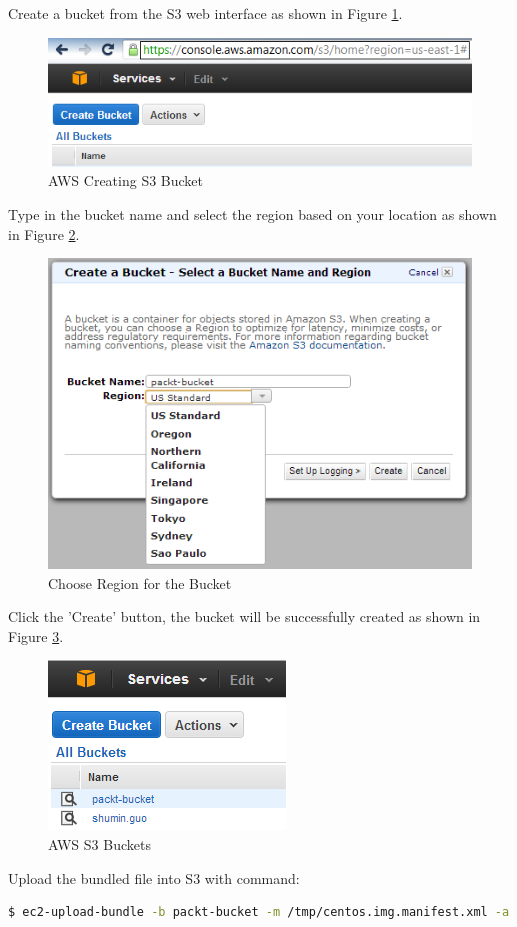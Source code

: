Create a bucket from the S3 web interface as shown in Figure \ref{fig:aws.s3.bucket.create}.
\begin{figure}[ht]
  \centering
  \includegraphics[width=.75\textwidth]{figs/5163os_08_17.png}
  \caption{AWS Creating S3 Bucket}\label{fig:aws.s3.bucket.create}
\end{figure} 
Type in the bucket name and select the region based on your location as shown in Figure \ref{fig:aws.s3.bucket.region}.
\begin{figure}[ht]
  \centering
  \includegraphics[width=.70\textwidth]{figs/5163os_08_18.png}
  \caption{Choose Region for the Bucket}\label{fig:aws.s3.bucket.region}
\end{figure} 
Click the 'Create' button, the bucket will be successfully created as shown in Figure \ref{fig:aws.s3.buckets}.
\begin{figure}[ht]
  \centering
  \includegraphics[width=.40\textwidth]{figs/5163os_08_19.png}
  \caption{AWS S3 Buckets}\label{fig:aws.s3.buckets}
\end{figure} 
Upload the bundled file into S3 with command:
\lstset{style=bashstyle}
\begin{lstlisting}[language=bash]
$ ec2-upload-bundle -b packt-bucket -m /tmp/centos.img.manifest.xml -a AKIAJ7GAQT52MZKJA4WQ -s QDHHZ0/Mj5pDYFWKpqEzXhwjqM1UB+cqjGQQ6l3S
\end{lstlisting}

